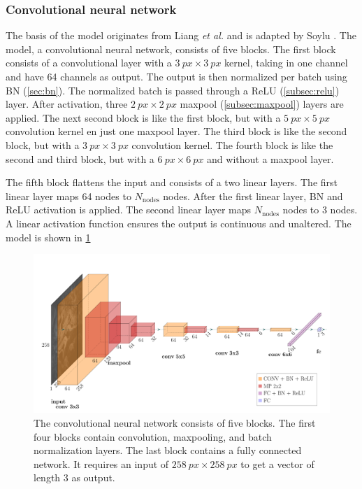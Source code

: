 \subsubsection{Convolutional neural network}
The basis of the model originates from Liang \emph{et al.} \cite{Liang2017} and is adapted by Soylu \cite{Soylu2022}.
The model, a convolutional neural network, consists of five blocks.
The first block consists of a convolutional layer with a $\qty{3}{px}\times\qty{3}{px}$ kernel, taking in one channel and have 64 channels as output.
The output is then normalized per batch using BN (\cref{sec:bn}).
The normalized batch is passed through a ReLU (\cref{subsec:relu}) layer.
After activation, three $\qty{2}{px}\times\qty{2}{px}$ maxpool (\cref{subsec:maxpool}) layers are applied.
The next second block is like the first block, but with a $\qty{5}{px}\times\qty{5}{px}$ convolution kernel en just one maxpool layer.
The third block is like the second block, but with a $\qty{3}{px}\times\qty{3}{px}$ convolution kernel.
The fourth block is like the second and third block, but with a $\qty{6}{px}\times\qty{6}{px}$ and without a maxpool layer.

The fifth block flattens the input and consists of a two linear layers.
The first linear layer maps 64 nodes to $N_\mathrm{nodes}$ nodes.
After the first linear layer, BN and ReLU activation is applied.
The second linear layer maps $N_\mathrm{nodes}$ nodes to 3 nodes.
A linear activation function ensures the output is continuous and unaltered.
The model is shown in \cref{fig:model}

\begin{figure}
    \includegraphics{skinstression/images/skinstression.pdf}
    \caption[Network architecture]{
        The convolutional neural network consists of five blocks.
        The first four blocks contain convolution, maxpooling, and batch normalization layers.
        The last block contains a fully connected network.
        It requires an input of $\qty{258}{px}\times\qty{258}{px}$ to get a vector of length 3 as output.
    }
    \label{fig:model}
\end{figure}

